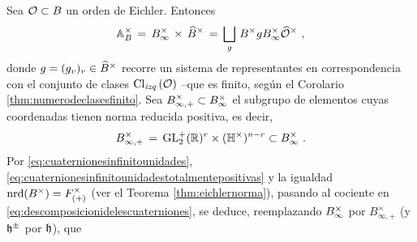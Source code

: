 % 
Sea $\cal{O}\subset B$ un orden de Eichler. Entonces
\begin{equation}
	\label{eq:descomposicionidelescuaterniones}
	\ideles{B} \,=\,\Idinf{B}\,\times\,\Idfin{B}
		\,=\, \bigsqcup_{g}\,
		B^{\times}g\Idinf{B}\Idfin{\cal{O}}
	\text{ ,}
\end{equation}
%
donde $g=(g_{v})_{v}\in\Idfin{B}$ recorre un sistema de representantes en
correspondencia con el conjunto de clases $\lClass{\cal{O}}$
--que es finito, seg\'{u}n el Corolario \ref{thm:numerodeclasesfinito}.
%
Sea $B_{\infty,+}^{\times}\subset\Idinf{B}$ el subgrupo de elementos cuyas
coordenadas tienen norma reducida positiva, es decir,
\begin{equation}
	\label{eq:cuaternionesinfinitounidadestotalmentepositivas}
	B_{\infty,+}^{\times} \,=\,
		\GLtp_{2}(\bb{R})^{r}\times (\bb{H}^{\times})^{n-r}
		\subset\Idinf{B}
	\text{ .}
\end{equation}
%
Por \eqref{eq:cuaternionesinfinitounidades},
\eqref{eq:cuaternionesinfinitounidadestotalmentepositivas} y la igualdad
\begin{math}
	\nrd(B^{\times})=F_{(+)}^{\times}
\end{math}
(ver el Teorema \ref{thm:eichlernorma}), pasando al cociente en
\eqref{eq:descomposicionidelescuaterniones}, se deduce, reemplazando
$\Idinf{B}$ por $B_{\infty,+}^{\times}$ (y $\hP^{\pm}$ por $\hP$), que
